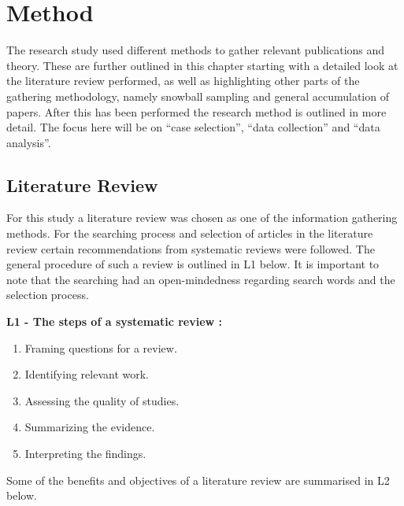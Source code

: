 \chapter{Method}

\minitoc

The research study used different methods to gather relevant publications and theory. These are further outlined in this chapter starting with a detailed look at the literature review performed, as well as highlighting other parts of the gathering methodology, namely snowball sampling and general accumulation of papers. After this has been performed the research method is outlined in more detail. The focus here will be on ``case selection'', ``data collection'' and ``data analysis''.

\newpage

\section{Literature Review}

For this study a literature review was chosen as one of the information gathering methods. For the searching process and selection of articles in the literature review certain recommendations from systematic reviews were followed. The general procedure of such a review is outlined in L1 below. It is important to note that the searching had an open-mindedness regarding search words and the selection process.

\vspace{0.5cm}

\begin{tcolorbox}[breakable, enhanced]
\textbf{L1 - The steps of a systematic review \cite{khan2003}:}

\begin{enumerate}
  \item Framing questions for a review.
  \item Identifying relevant work.
  \item Assessing the quality of studies.
  \item Summarizing the evidence.
  \item Interpreting the findings.
\end{enumerate}
\end{tcolorbox}

\vspace{0.5cm}

Some of the benefits and objectives of a literature review are summarised in L2 below.

